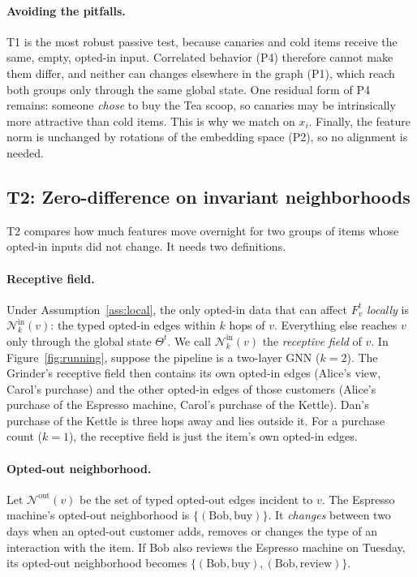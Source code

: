 \documentclass[10pt,twocolumn,letterpaper]{article}
\theoremstyle{definition}
\newcommand{\N}{\mathcal{N}}
\begin{document}
\paragraph{Avoiding the pitfalls.}
T1 is the most robust passive test, because canaries and cold items receive
the same, empty, opted-in input. Correlated behavior (P4) therefore cannot make
them differ, and neither can changes elsewhere in the graph (P1), which reach
both groups only through the same global state. One residual form of P4
remains: someone \emph{chose} to buy the Tea scoop, so canaries may be
intrinsically more attractive than cold items. This is why we match on $x_i$.
Finally, the feature norm is unchanged by rotations of the embedding space
(P2), so no alignment is needed.

\subsection{T2: Zero-difference on invariant neighborhoods}
T2 compares how much features move overnight for two groups of items whose
opted-in inputs did not change. It needs two definitions.

\paragraph{Receptive field.}
Under Assumption~\ref{ass:local}, the only opted-in data that can affect
$F_v^t$ \emph{locally} is $\N_k^{\mathrm{in}}(v)$: the typed opted-in edges within $k$
hops of $v$. Everything else reaches $v$ only through the global state
$\Theta^t$. We call $\N_k^{\mathrm{in}}(v)$ the \emph{receptive field} of $v$. In
Figure~\ref{fig:running}, suppose the pipeline is a two-layer GNN ($k=2$).
The Grinder's receptive field then contains its own opted-in edges (Alice's
view, Carol's purchase) and the other opted-in edges of those customers
(Alice's purchase of the Espresso machine, Carol's purchase of the Kettle).
Dan's purchase of the Kettle is three hops away and lies outside it. For a
purchase count ($k=1$), the receptive field is just the item's own opted-in
edges.

\paragraph{Opted-out neighborhood.}
Let $\N^{\mathrm{out}}(v)$ be the set of typed opted-out edges incident to $v$. The
Espresso machine's opted-out neighborhood is $\{(\text{Bob}, \text{buy})\}$. It
\emph{changes} between two days when an opted-out customer adds, removes or
changes the type of an interaction with the item. If Bob also reviews the
Espresso machine on Tuesday, its opted-out neighborhood becomes
$\{(\text{Bob},\text{buy}), (\text{Bob},\text{review})\}$.
\end{document}
